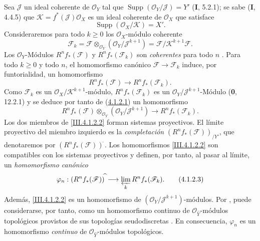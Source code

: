 \begin{env}[4.1.2]
\label{III.4.1.2}
\label{III.4.1.2-fr}
Sea $\mathcal J$ un ideal coherente de $\mathcal O_Y$ tal que
$\operatorname{Supp}(\mathcal O_Y/\mathcal J)=Y'$ (\textbf{I}, 5.2.1); se sabe (\textbf{I}, 4.4.5) que $\mathcal K=f^*(\mathcal J)\mathcal O_X$
es un ideal coherente de $\mathcal O_X$ que satisface
\[
\operatorname{Supp}(\mathcal O_X/\mathcal K)=X'.
\]
Consideraremos para todo $k\geq0$ los $\mathcal O_X$-módulo coherente
\[
\mathcal F_k
=\mathcal F\otimes_{\mathcal O_Y}(\mathcal O_Y/\mathcal J^{k+1})
=\mathcal F/\mathcal K^{k+1}\mathcal F.
\]
Los $\mathcal O_Y$-Módulos $R^nf_*(\mathcal F)$ y
$R^nf_*(\mathcal F_k)$ son \emph{coherentes} para todo $n$ .
Para todo $k\geq0$ y todo $n$, el homomorfismo canónico
$\mathcal F\to\mathcal F_k$ induce, por funtorialidad, un homomorfismo
\[
R^nf_*(\mathcal F)\longrightarrow R^nf_*(\mathcal F_k).
\tag{4.1.2.1}\label{III.4.1.2.1-fr}
\]
Como $\mathcal F_k$ es un $\mathcal O_X/\mathcal K^{k+1}$-módulo,
$R^nf_*(\mathcal F_k)$ es un
$\mathcal O_Y/\mathcal J^{k+1}$-Módulo (\textbf{0}, 12.2.1) y se deduce por tanto de (\hyperref[III.4.1.2.1-fr]{4.1.2.1}) un homomorfismo \[
R^nf_*(\mathcal F)\otimes_{\mathcal O_Y}
(\mathcal O_Y/\mathcal J^{k+1})
\longrightarrow R^nf_*(\mathcal F_k).
\tag{4.1.2.2}\label{III.4.1.2.2-fr}
\]
Los dos miembros de \eqref{III.4.1.2.2} forman sistemas proyectivos.
El límite proyectivo del miembro izquierdo es la \emph{completación}
$(R^nf_*(\mathcal F))_{/Y'}$,
que denotaremos por
$(R^nf_*(\mathcal F))^{\widehat{\,}}$.
Los homomorfismos \eqref{III.4.1.2.2} son compatibles con los sistemas
proyectivos y definen, por tanto, al pasar al límite, un \emph{homomorfismo
canónico}
\[
\varphi_n:(R^nf_*(\mathcal F))^{\widehat{\,}}
\longrightarrow\varprojlim_kR^nf_*(\mathcal F_k).
\tag{4.1.2.3}\label{III.4.1.2.3-fr}
\]
Además, \eqref{III.4.1.2.2} es un homomorfismo de
$(\mathcal O_Y/\mathcal J^{k+1})$-módulos.
Por , puede considerarse, por tanto, como un
homomorfismo continuo de $\mathcal O_{\widehat Y}$-módulos topológicos
provistos de sus topologías seudodiscretas .
En consecuencia, $\varphi_n$ es un homomorfismo \emph{continuo} de
$\mathcal O_{\widehat Y}$-módulos topológicos.
\end{env}

